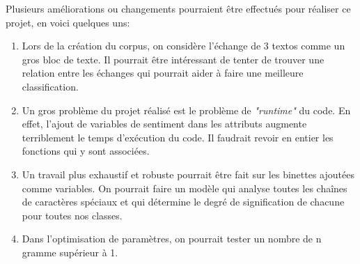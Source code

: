 Plusieurs améliorations ou changements pourraient être effectués pour réaliser ce projet, en voici quelques uns:

\begin{enumerate}
\item Lors de la création du corpus, on considère l'échange de 3 textos comme un gros bloc de texte. Il pourrait être intéressant de tenter de trouver une relation entre les échanges qui pourrait aider à faire une meilleure classification.

\item Un gros problème du projet réalisé est le problème de \emph{"runtime"} du code. En effet, l'ajout de variables de sentiment dans les attributs augmente terriblement le temps d'exécution du code. Il faudrait revoir en entier les fonctions qui y sont associées.

\item Un travail plus exhaustif et robuste pourrait être fait sur les binettes ajoutées comme variables. On pourrait faire un modèle qui analyse toutes les chaînes de caractères spéciaux et qui détermine le degré de signification de chacune pour toutes nos classes.

\item Dans l'optimisation de paramètres, on pourrait tester un nombre de n gramme supérieur à 1.
\end{enumerate}